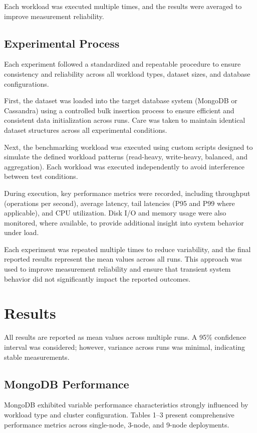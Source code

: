 \documentclass[12pt]{article}
\begin{document}
Each workload was executed multiple times, and the results were averaged to improve measurement reliability.

\subsection{Experimental Process}

Each experiment followed a standardized and repeatable procedure to ensure consistency and reliability across all workload types, dataset sizes, and database configurations.

First, the dataset was loaded into the target database system (MongoDB or Cassandra) using a controlled bulk insertion process to ensure efficient and consistent data initialization across runs. Care was taken to maintain identical dataset structures across all experimental conditions.

Next, the benchmarking workload was executed using custom scripts designed to simulate the defined workload patterns (read-heavy, write-heavy, balanced, and aggregation). Each workload was executed independently to avoid interference between test conditions.

During execution, key performance metrics were recorded, including throughput (operations per second), average latency, tail latencies (P95 and P99 where applicable), and CPU utilization. Disk I/O and memory usage were also monitored, where available, to provide additional insight into system behavior under load.

Each experiment was repeated multiple times to reduce variability, and the final reported results represent the mean values across all runs. This approach was used to improve measurement reliability and ensure that transient system behavior did not significantly impact the reported outcomes.

\section{Results}

All results are reported as mean values across multiple runs. A 95\% confidence interval was considered; however, variance across runs was minimal, indicating stable measurements.

\subsection{MongoDB Performance}

MongoDB exhibited variable performance characteristics strongly influenced by workload type and cluster configuration. Tables 1--3 present comprehensive performance metrics across single-node, 3-node, and 9-node deployments.
\end{document}
